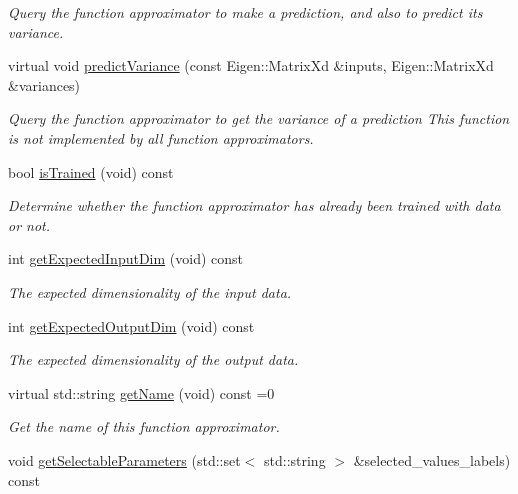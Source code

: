 \begin{DoxyCompactItemize}
\begin{DoxyCompactList}\small\item\em Query the function approximator to make a prediction, and also to predict its variance. \end{DoxyCompactList}\item 
virtual void \hyperlink{classDmpBbo_1_1FunctionApproximator_ae7931f49eb4d095e1c007edcbad58684}{predict\+Variance} (const Eigen\+::\+Matrix\+Xd \&inputs, Eigen\+::\+Matrix\+Xd \&variances)
\begin{DoxyCompactList}\small\item\em Query the function approximator to get the variance of a prediction This function is not implemented by all function approximators. \end{DoxyCompactList}\item 
bool \hyperlink{classDmpBbo_1_1FunctionApproximator_a178135f623d9b9058870851a53299c6e}{is\+Trained} (void) const 
\begin{DoxyCompactList}\small\item\em Determine whether the function approximator has already been trained with data or not. \end{DoxyCompactList}\item 
int \hyperlink{classDmpBbo_1_1FunctionApproximator_af5a550bcf65d5a29a153a594cc4e3fa1}{get\+Expected\+Input\+Dim} (void) const 
\begin{DoxyCompactList}\small\item\em The expected dimensionality of the input data. \end{DoxyCompactList}\item 
int \hyperlink{classDmpBbo_1_1FunctionApproximator_a6ad3f18b3d0ebb913a6a914be60b77e1}{get\+Expected\+Output\+Dim} (void) const 
\begin{DoxyCompactList}\small\item\em The expected dimensionality of the output data. \end{DoxyCompactList}\item 
virtual std\+::string \hyperlink{classDmpBbo_1_1FunctionApproximator_a8c8a804456f63ff9a3acc4dacf6163a5}{get\+Name} (void) const =0
\begin{DoxyCompactList}\small\item\em Get the name of this function approximator. \end{DoxyCompactList}\item 
void \hyperlink{classDmpBbo_1_1FunctionApproximator_a887f4747734bd8b7cc4f799092ff31b4}{get\+Selectable\+Parameters} (std\+::set$<$ std\+::string $>$ \&selected\+\_\+values\+\_\+labels) const 

\end{DoxyCompactItemize}
